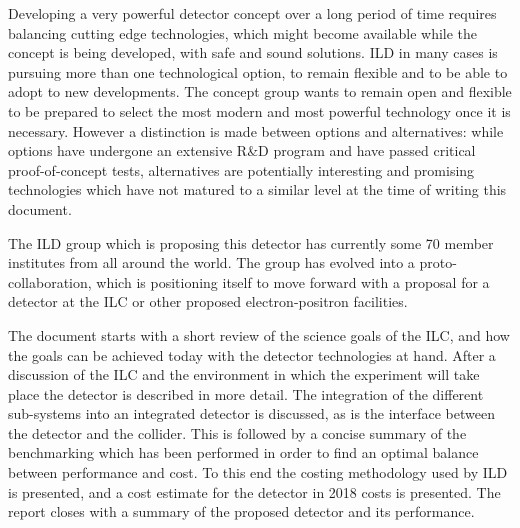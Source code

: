 Developing a very powerful detector concept over a long period of time requires balancing cutting edge technologies, which might become available while the concept is being developed, with safe and sound solutions. ILD in many cases is pursuing more than one technological option, to remain flexible and to be able to adopt to new developments. The concept group  wants to remain open and flexible to be prepared to select the most modern and most powerful technology once it is necessary. 
However a distinction is made between options and alternatives: while options have undergone an extensive R\&D program and have passed critical proof-of-concept tests, alternatives are potentially interesting and promising technologies which have not matured to a similar level at the time of writing this document. 

The ILD group which is proposing this detector has currently some 70 member institutes from all around the world. The group has evolved into a proto-collaboration, which is positioning itself to move forward with a proposal for a detector at the ILC or other proposed electron-positron facilities.

The document starts with a short review of the science goals of the ILC, and how the goals can be achieved today with the detector technologies at hand. After a discussion of the ILC and the environment in which the experiment will take place the detector is described in more detail. The integration of the different sub-systems into an integrated detector is discussed, as is the interface between the detector and the collider. This is followed by a concise summary of the benchmarking which has been performed in order to find an optimal balance between performance and cost. To this end the costing methodology used by ILD is presented, and a cost estimate for the detector in 2018 costs is presented. The report closes with a summary of the proposed detector and its performance. 